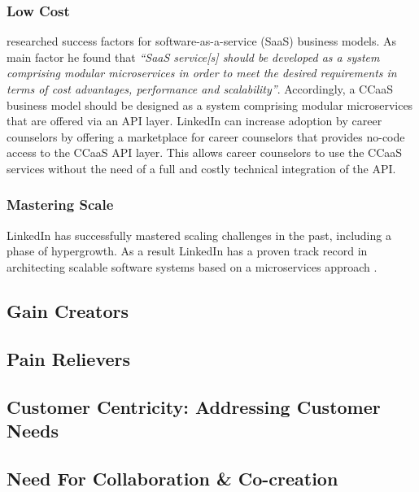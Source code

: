\subsubsection*{Low Cost}

\cite{floereckeSuccessFactorsSaaS2018} researched success factors for software-as-a-service (SaaS) business models. As 
main factor he found that \textit{``SaaS service[s] should be developed as a system comprising modular microservices
in order to meet the desired requirements in terms of cost advantages, performance and scalability''}. Accordingly, a
CCaaS business model should be designed as a system comprising modular microservices that are offered via an API layer.
LinkedIn can increase adoption by career counselors by offering a marketplace for career counselors that provides
no-code access to the CCaaS API layer. This allows career counselors to use the CCaaS services without the need 
of a full and costly technical integration of the API.

\subsubsection{Mastering Scale}

LinkedIn has successfully mastered scaling challenges in the past, including a phase of hypergrowth. As a result
LinkedIn has a proven track record in architecting scalable software systems based on a microservices approach
\citep{linkedinBriefHistoryScaling2015}.


\subsection{Gain Creators}

\subsection{Pain Relievers}

\subsection{Customer Centricity: Addressing Customer Needs}

\subsection{Need For Collaboration \& Co-creation}

